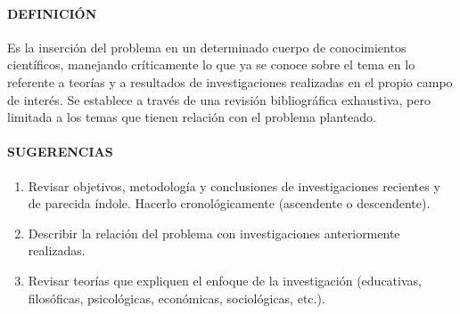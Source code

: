 \paragraph{DEFINICIÓN}
Es la inserción del problema en un determinado cuerpo de conocimientos científicos, manejando críticamente lo que ya se conoce sobre el tema en lo referente a teorías y a resultados de investigaciones realizadas en el propio campo de interés. Se establece a través de una revisión bibliográfica exhaustiva, pero limitada a los temas que tienen relación con el problema planteado.


\paragraph{SUGERENCIAS}

\begin{enumerate}
 \item Revisar objetivos, metodología y conclusiones de investigaciones recientes y de parecida índole. Hacerlo cronológicamente (ascendente o descendente).
 \item Describir la relación del problema con investigaciones anteriormente realizadas.
 \item Revisar teorías que expliquen el enfoque de la investigación (educativas, filosóficas, psicológicas, económicas, sociológicas, etc.).
\end{enumerate}
